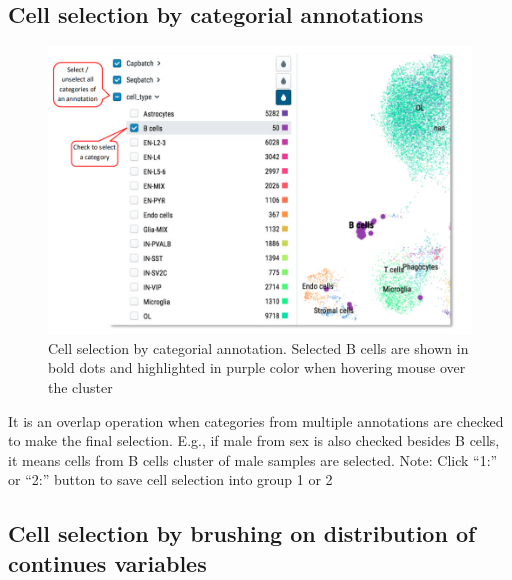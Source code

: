 \documentclass[
]{article}
\begin{document}
\hypertarget{cell-selection-by-categorial-annotations}{%
\subsection{Cell selection by categorial annotations}\label{cell-selection-by-categorial-annotations}}

\begin{figure}
\centering
\includegraphics{figures/F2.jpg}
\caption{Cell selection by categorial annotation. Selected B cells are shown in bold dots and highlighted in purple color when hovering mouse over the cluster}
\end{figure}

It is an overlap operation when categories from multiple annotations are checked to make the final selection. E.g., if male from sex is also checked besides B cells, it means cells from B cells cluster of male samples are selected.
Note: Click ``1:'' or ``2:'' button to save cell selection into group 1 or 2

\hypertarget{cell-selection-by-brushing-on-distribution-of-continues-variables}{%
\subsection{Cell selection by brushing on distribution of continues variables}\label{cell-selection-by-brushing-on-distribution-of-continues-variables}}
\end{document}
